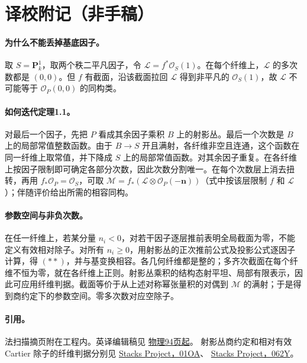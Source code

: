 \documentclass[openany,fontset=fandol]{ctexbook}
\newcommand{\OO}{\mathcal O}
\newcommand{\LL}{\mathcal L}
\newcommand{\MM}{\mathcal M}
\newcommand{\nn}{\boldsymbol n}
\begin{document}
\section*{译校附记（非手稿）}
\paragraph{为什么不能丢掉基底因子。}
取 \(S=\mathbf P_k^1\)，取两个秩二平凡因子，令 \(\LL=f^*\OO_S(1)\)。在每个纤维上，\(\LL\) 的多次数都是 \((0,0)\)。但 \(f\) 有截面，沿该截面拉回 \(\LL\) 得到非平凡的 \(\OO_S(1)\)，故 \(\LL\) 不可能等于 \(\OO_P(0,0)\) 的同构类。

\paragraph{如何迭代定理1.1。}
对最后一个因子，先把 \(P\) 看成其余因子乘积 \(B\) 上的射影丛。最后一个次数是 \(B\) 上的局部常值整数函数。由于 \(B\to S\) 开且满射，各纤维非空且连通，这个函数在同一纤维上取常值，并下降成 \(S\) 上的局部常值函数。对其余因子重复。在各纤维上按因子限制即可确定各部分次数，因此次数分割唯一。在每个次数层上消去扭转，再用 \(f_*\OO_P=\OO_S\)，可取
\(\MM=f_*(\LL\otimes\OO_P(-\nn))\)（式中按该层限制 \(f\) 和 \(\LL\)）；伴随评价给出所需的相容同构。

\paragraph{参数空间与非负次数。}
在任一纤维上，若某分量 \(n_i<0\)，对若干因子逐层推前表明全局截面为零，不能定义有效相对除子。对所有 \(n_i\ge0\)，用射影丛的正次推前公式及投影公式逐因子计算，得 \((**)\)，并与基变换相容。各几何纤维都是整的；多齐次截面在每个纤维不恒为零，就在各纤维上正则。射影丛乘积的结构态射平坦、局部有限表示，因此可应用纤维判据。截面等价于从上述对称幂张量积的对偶到 \(\MM\) 的满射；于是得到商约定下的参数空间。零多次数对应空除子。

\paragraph{引用。}
法扫描摘页附在工程内。英译编辑稿见
\href{https://webusers.imj-prg.fr/~leila.schneps/grothendieckcircle/EGA/EGA5trans.pdf#page=94}{物理94页起}。
射影丛商约定和相对有效 Cartier 除子的纤维判据分别见
\href{https://stacks.math.columbia.edu/tag/01OA}{Stacks Project，01OA}、
\href{https://stacks.math.columbia.edu/tag/062Y}{Stacks Project，062Y}。
\end{document}
